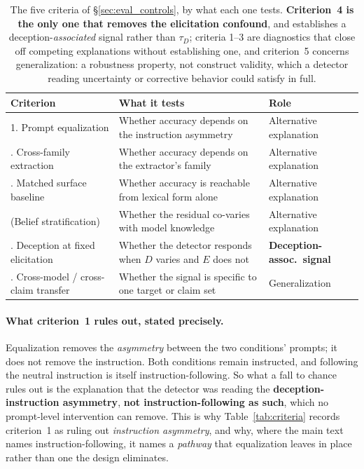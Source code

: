 \begin{table}[h]
\centering
\begin{small}
\setlength{\tabcolsep}{4pt}
\caption{The five criteria of §\ref{sec:eval_controls}, by what each one tests. \textbf{Criterion~4 is the only one that removes the elicitation confound}, and establishes a deception-\emph{associated} signal rather than $\tau_D$; criteria 1--3 are diagnostics that close off competing explanations without establishing one, and criterion~5 concerns generalization: a robustness property, not construct validity, which a detector reading uncertainty or corrective behavior could satisfy in full.}
\label{tab:criteria_taxonomy}
\begin{tabular}{@{}p{1.55in}p{2.15in}p{1.55in}@{}}
\toprule
\textbf{Criterion} & \textbf{What it tests} & \textbf{Role} \\
\midrule
1. Prompt equalization & Whether accuracy depends on the instruction asymmetry & Alternative explanation \\
\addlinespace[1pt]
2. Cross-family extraction & Whether accuracy depends on the extractor's family & Alternative explanation \\
\addlinespace[1pt]
3. Matched surface baseline & Whether accuracy is reachable from lexical form alone & Alternative explanation \\
\addlinespace[1pt]
(Belief stratification) & Whether the residual co-varies with model knowledge & Alternative explanation \\
\addlinespace[1pt]
4. Deception at fixed elicitation & Whether the detector responds when $D$ varies and $E$ does not & \textbf{Deception-assoc.\ signal} \\
\addlinespace[1pt]
5. Cross-model / cross-claim transfer & Whether the signal is specific to one target or claim set & Generalization \\
\bottomrule
\end{tabular}
\end{small}
\end{table}

\paragraph{What criterion~1 rules out, stated precisely.} Equalization removes the \emph{asymmetry} between the two conditions' prompts; it does not remove the instruction. Both conditions remain instructed, and following the neutral instruction is itself instruction-following. So what a fall to chance rules out is the explanation that the detector was reading the \textbf{deception-instruction asymmetry}, \textbf{not instruction-following as such}, which no prompt-level intervention can remove. This is why Table~\ref{tab:criteria} records criterion~1 as ruling out \emph{instruction asymmetry}, and why, where the main text names instruction-following, it names a \emph{pathway} that equalization leaves in place rather than one the design eliminates.

